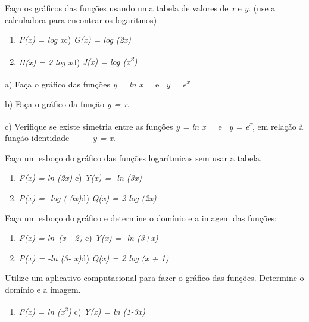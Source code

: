 \begin{exercicios}
	\exitem{} Faça os gráficos das funções usando uma tabela de valores de \textit{x} e \textit{y}. (use a calculadora para encontrar os logaritmos)

    \begin{enumerate}
	    \item \textit{F(x) = log x\quad }\quad c) \textit{G(x) = log (2x)}

	    \item \textit{H(x) = 2 log x\quad }\quad d) \textit{J(x) = log (x\textsuperscript{2})}
    \end{enumerate}

    \exitem{} a) Faça o gráfico das funções \textit{y = ln x}~~~e~  \textit{y = e\textsuperscript{x}}.~ 

        b) Faça o gráfico da função \textit{y = x}.

	c) Verifique se existe simetria entre as funções \textit{y = ln x}~~~e~  \textit{y = e\textsuperscript{x}}, em relação à função identidade~~~~~ \textit{y = x}.

	\exitem{} Faça um esboço do gráfico das funções logarítmicas sem usar a tabela.
    \begin{enumerate}
	    \item \textit{F(x) = ln (2x)} \quad \quad \quad c) \textit{Y(x) = -ln (3x)}

	    \item \textit{P(x) = -log (-5x)\quad \quad \quad }d) \textit{Q(x) = 2 log (2x)} 
    \end{enumerate}

	\exitem{} Faça um esboço do gráfico e determine o domínio e a imagem das funções:

    \begin{enumerate}
	    \item \textit{F(x) = ln~(x -  2) \quad \quad }\quad c) \textit{Y(x) = -ln (3+x)}

	    \item \textit{P(x) = -ln (3- x)\quad \quad }\quad d) \textit{Q(x) = 2 log (x + 1)} 
    \end{enumerate}

	\exitem{} Utilize um aplicativo computacional para fazer o gráfico das funções. Determine o domínio e a imagem.
    \begin{enumerate}
	    \item \textit{F(x) = ln (x\textsuperscript{2}) \quad \quad }\quad c) \textit{Y(x) = ln (1-3x)}


\end{enumerate}
\end{exercicios}
